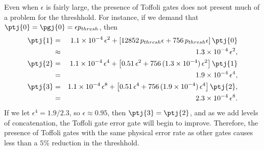 Even when $\epsilon$ is fairly large, the presence of Toffoli gates does
not present much of a problem for the threshhold.  For instance, if we demand
that $\ptj{0} = \pgj{0} = \epsilon p_{thresh}$, then
\begin{eqnarray}
	\ptj{1} & = & 1.1 \times 10^{-4}\,\epsilon^2 + \left[12852\,p_{thresh} \epsilon
	+ 756\,p_{thresh} \epsilon \right] \ptj{0} \\
	& \approx & 1.3 \times 10^{-4}\,\epsilon^2, \\
	\ptj{2} & = & 1.1 \times 10^{-4}\,\epsilon^4 + \left[0.51\,\epsilon^2 +
	756\,(1.3 \times 10^{-4})\,\epsilon^2 \right] \ptj{1} \\
	& = & 1.9 \times 10^{-4}\,\epsilon^4, \\
	\ptj{3} & = & 1.1 \times 10^{-4}\,\epsilon^8 + \left[0.51\,\epsilon^4 +
	756\,(1.9 \times 10^{-4})\,\epsilon^4 \right] \ptj{2}, \\
	& = & 2.3 \times 10^{-4}\,\epsilon^8.
\end{eqnarray}
If we let $\epsilon^4 = 1.9 / 2.3$, so $\epsilon \approx 0.95$, then $\ptj{3} =
\ptj{2}$, and as we add levels of concatenation, the Toffoli gate error gate
will begin to improve.  Therefore, the presence of Toffoli gates with the same
physical error rate as other gates causes less than a $5\%$ reduction in the
threshhold.